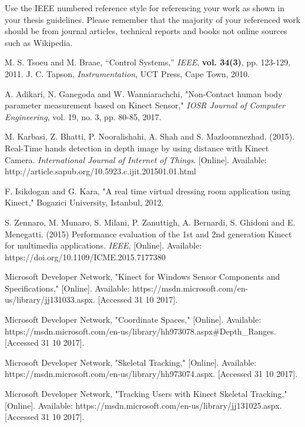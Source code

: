 Use the IEEE numbered reference style for referencing your work as shown in your thesis guidelines.
Please remember that the majority of your referenced work should be from journal articles, technical
reports and books not online sources such as Wikipedia.

\begin{thebibliography}{5}
 M. S. Tsoeu and M. Braae, ``Control Systems,'' \emph{IEEE}, {\bf vol. 34(3)}, pp. 123-129, 2011.
 J. C. Tapson, \emph{Instrumentation}, UCT Press, Cape Town, 2010.

 A. Adikari, N. Ganegoda and W. Wanniarachchi, "Non-Contact human body parameter measurement based on Kinect Sensor," \emph{IOSR Journal of Computer Engineering}, vol. 19, no. 3, pp. 80-85, 2017. 

 M. Karbasi, Z. Bhatti, P. Nooralishahi, A. Shah and S. Mazloomnezhad. (2015). Real-Time hands detection in depth image by using distance with Kinect Camera. \emph{International Journal of Internet of Things}. [Online]. Available: http://article.sapub.org/10.5923.c.ijit.201501.01.html

 F. Isikdogan and G. Kara, "A real time virtual dressing room application using Kinect," Bogazici University, Istanbul, 2012.

 S. Zennaro, M. Munaro, S. Milani, P. Zanuttigh, A. Bernardi, S. Ghidoni and E. Menegatti. (2015) Performance evaluation of the 1st and 2nd generation Kinect for multimedia applications. \emph{IEEE}, [Online]. Available: https://doi.org/10.1109/ICME.2015.7177380

 Microsoft Developer Network, "Kinect for Windows Sensor Components and Specifications," [Online]. Available: https://msdn.microsoft.com/en-us/library/jj131033.aspx. [Accessed 31 10 2017].

 Microsoft Developer Network, "Coordinate Spaces," [Online]. Available: https://msdn.microsoft.com/en-us/library/hh973078.aspx\#Depth\_Ranges. [Accessed 31 10 2017].

 Microsoft Developer Network, "Skeletal Tracking," [Online]. Available: https://msdn.microsoft.com/en-us/library/hh973074.aspx. [Accessed 31 10 2017].

 Microsoft Developer Network, "Tracking Users with Kinect Skeletal Tracking," [Online]. Available: https://msdn.microsoft.com/en-us/library/jj131025.aspx. [Accessed 31 10 2017].
\end{thebibliography}
